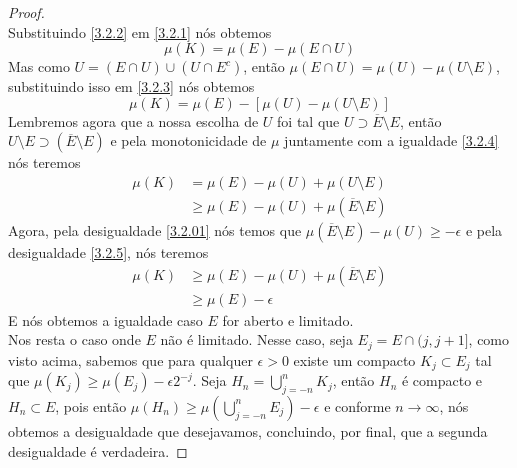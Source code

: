 \begin{teorema}
\begin{proof}
\begin{equation}
            \label{3.2.2}
        \end{equation}
        Substituindo \ref{3.2.2} em \ref{3.2.1} nós obtemos 
        \begin{equation}
            \mu(K) = \mu(E) - \mu(E \cap U)
            \label{3.2.3}
        \end{equation}
        Mas como $U = (E \cap U) \cup (U \cap E ^c)$, então $\mu(E \cap U) = \mu(U) - \mu(U \setminus E)$, substituindo isso em \ref{3.2.3} nós obtemos
        \begin{equation}
            \mu(K) = \mu(E) - [\mu(U) - \mu(U \setminus E)]
            \label{3.2.4}
        \end{equation}
        Lembremos agora que a nossa escolha de $U$ foi tal que $U \supset \overline{E} \setminus E$, então $U \setminus E \supset (\overline{E} \setminus E)$ e pela monotonicidade de $\mu$ juntamente com a igualdade \ref{3.2.4} nós teremos
        \begin{equation}
            \begin{split}
                \mu(K) & = \mu(E) - \mu(U) + \mu(U \setminus E) \\    
                       & \geq \mu(E) - \mu(U) + \mu(\overline{E} \setminus E) 
            \end{split}
            \label{3.2.5}
        \end{equation}  
        Agora, pela desigualdade \ref{3.2.01} nós temos que $ \mu(\overline{E}\setminus E) - \mu(U) \geq - \epsilon$ e pela desigualdade \ref{3.2.5}, nós teremos
        \begin{equation}
            \begin{split}
                \mu(K) & \geq \mu(E) - \mu(U) + \mu(\overline{E} \setminus E) \\
                       & \geq \mu(E) - \epsilon
            \end{split}
        \label{3.2.6}    
        \end{equation}
        E nós obtemos a igualdade caso $E$ for aberto e limitado. \\
        Nos resta o caso onde $E$ não é limitado. Nesse caso, seja $E_j = E \cap (j, j+1]$, como visto acima, sabemos que para qualquer $\epsilon>0$ existe um compacto $K_j \subset E_j$ tal que $\mu(K_j) \geq \mu(E_j) - \epsilon 2^{-j}$. Seja $H_n = \bigcup _{j=-n} ^n K_j$, então $H_n$ é compacto e $H_n \subset E$, pois então $\mu(H_n) \geq \mu(\bigcup _{j=-n} ^n E_j) - \epsilon$ e conforme $n \to \infty$, nós obtemos a desigualdade que desejavamos, concluindo, por final, que a segunda desigualdade é verdadeira.
    \end{proof}
\end{teorema}


